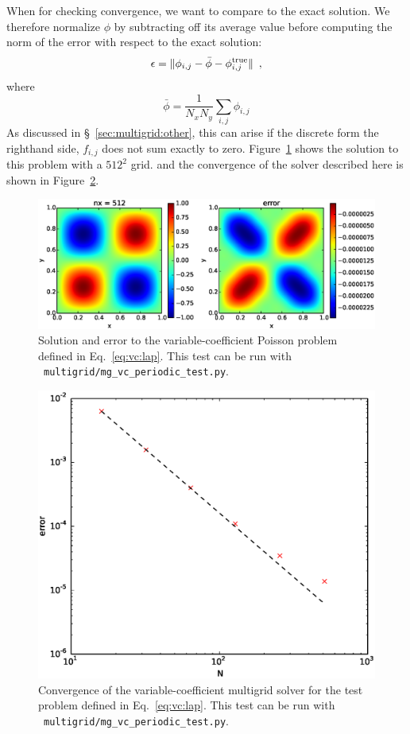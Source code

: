 When for checking convergence, we want to compare to the exact solution.
We therefore normalize $\phi$ by subtracting off its average value before
computing the norm of the error with respect to the exact solution:
\begin{equation}
\epsilon = \| \phi_{i,j} - \bar{\phi} - \phi^\mathrm{true}_{i,j} \| \enskip ,
\end{equation}
where
\begin{equation}
\bar{\phi} = \frac{1}{N_x N_y} \sum_{i,j} \phi_{i,j}
\end{equation}
As discussed in \S~\ref{sec:multigrid:other}, this can arise if
the discrete form the righthand side, $f_{i,j}$ does not sum exactly
to zero.  Figure~\ref{fig:mg_vc} shows the solution to this problem
with a $512^2$ grid. and the convergence of the solver described
here is shown in Figure~\ref{fig:mg_vc_converge}.

\begin{figure}[t]
\centering
\includegraphics[width=\linewidth]{mg_vc_periodic_test}
\caption[Solution and error of a variable-coefficient Poisson problem]{\label{fig:mg_vc} Solution and error to the variable-coefficient 
Poisson problem defined in Eq.~\ref{eq:vc:lap}.  This test can be
run with \pyro\ {\tt multigrid/mg\_vc\_periodic\_test.py}.}
\end{figure}

\begin{figure}[t]
\centering
\includegraphics[width=0.8\linewidth]{mg_vc_converge}
\caption[Convergence of the variable-coefficient Poisson solver]{\label{fig:mg_vc_converge} Convergence of the variable-coefficient
multigrid solver for the test problem defined in Eq.~\ref{eq:vc:lap}.  This test can be
run with \pyro\ {\tt multigrid/mg\_vc\_periodic\_test.py}.}
\end{figure}


